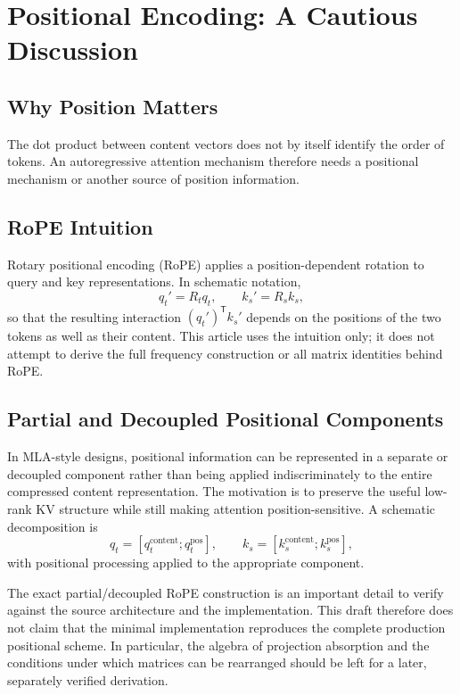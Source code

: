 \documentclass[11pt]{article}
\begin{document}
\section{Positional Encoding: A Cautious Discussion}

\subsection{Why Position Matters}

The dot product between content vectors does not by itself identify the order
of tokens. An autoregressive attention mechanism therefore needs a positional
mechanism or another source of position information.

\subsection{RoPE Intuition}

Rotary positional encoding (RoPE) applies a position-dependent rotation to
query and key representations. In schematic notation,
\begin{equation}
    q_t' = R_tq_t, \qquad k_s'=R_sk_s,
\end{equation}
so that the resulting interaction $(q_t')^{\mathsf T}k_s'$ depends on the
positions of the two tokens as well as their content. This article uses the
intuition only; it does not attempt to derive the full frequency construction
or all matrix identities behind RoPE.

\subsection{Partial and Decoupled Positional Components}

In MLA-style designs, positional information can be represented in a separate
or decoupled component rather than being applied indiscriminately to the entire
compressed content representation. The motivation is to preserve the useful
low-rank KV structure while still making attention position-sensitive. A
schematic decomposition is
\begin{equation}
    q_t = [q_t^{\mathrm{content}};q_t^{\mathrm{pos}}],\qquad
    k_s = [k_s^{\mathrm{content}};k_s^{\mathrm{pos}}],
\end{equation}
with positional processing applied to the appropriate component.

The exact partial/decoupled RoPE construction is an important detail to verify
against the source architecture and the implementation. This draft therefore
does not claim that the minimal implementation reproduces the complete
production positional scheme. In particular, the algebra of projection
absorption and the conditions under which matrices can be rearranged should be
left for a later, separately verified derivation.
\end{document}
